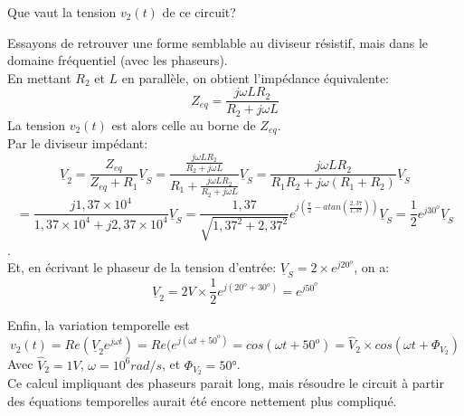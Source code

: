 { 
Que vaut la tension $v_2(t)$ de ce circuit?
}
{ 
Essayons de retrouver une forme semblable au diviseur résistif, mais dans le domaine fréquentiel (avec les phaseurs).\\
En mettant $R_2$ et $L$ en parallèle, on obtient l'impédance équivalente: $$Z_{eq}=\frac{j\omega LR_2}{R_2+j\omega L}$$
La tension $v_2(t)$ est alors celle au borne de $Z_{eq}$.\\
Par le diviseur impédant:
$$\underline{V}_2=\frac{Z_{eq}}{Z_{eq}+R_1}\underline{V}_S=\frac{\frac{j\omega LR_2}{R_2+j\omega L}}{R_1+\frac{j\omega LR_2}{R_2+j\omega L}}\underline{V}_S=\frac{j\omega LR_2}{R_1R_2+j\omega(R_1+R_2)}\underline{V}_S$$
$$=\frac{j1,37\times 10^4}{1,37\times 10^4+j2,37\times 10^4}\underline{V}_S=\frac{1,37}{\sqrt{1,37^2+2,37^2}}e^{j(\frac{\pi}{2}-atan(\frac{2,37}{1,37}))}\underline{V}_S=\frac{1}{2}e^{j30^o}\underline{V}_S$$.\\

Et, en écrivant le phaseur de la tension d'entrée: $\underline{V}_S=2\times e^{j20^o}$, on a:
$$\underline{V}_2=2V\times \frac{1}{2}e^{j(20^o+30^o)}=e^{j50^o}$$

Enfin, la variation temporelle est
$$v_2(t)=Re(\underline{V}_2e^{j\omega t})=Re(e^{j(\omega t+50^o)}=cos(\omega t+50^o)=\widehat{V}_2\times cos(\omega t+ \Phi_{V_2})$$
Avec $\widehat{V}_2=1V$, $\omega=10^6rad/s$, et $\Phi_{V_2}=50°$.\\

Ce calcul impliquant des phaseurs parait long, mais résoudre le circuit à partir des équations temporelles aurait été encore nettement plus compliqué.

}



